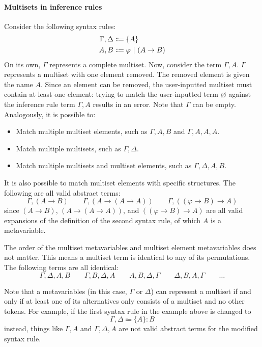 \paragraph{Multisets in inference rules}
\label{inference:multisets}
Consider the following syntax rules:
\begin{align*}
    \Gamma, \Delta &\Coloneqq \{ A \} \\
    A, B &\Coloneqq \varphi \ |\  (A \to B)
\end{align*}
On its own, $\Gamma$ represents a complete multiset. Now, consider the term $\Gamma, A$. $\Gamma$ represents a multiset with one element removed. The removed element is given the name $A$. Since an element can be removed, the user-inputted multiset must contain at least one element: trying to match the user-inputted term $\varnothing$ against the inference rule term $\Gamma, A$ results in an error. Note that $\Gamma$ can be empty. Analogously, it is possible to:
\begin{itemize}
    \item Match multiple multiset elements, such as $\Gamma, A, B$ and $\Gamma, A, A, A$.
    \item Match multiple multisets, such as $\Gamma, \Delta$.
    \item Match multiple multisets and multiset elements, such as $\Gamma, \Delta, A, B$.
\end{itemize}

It is also possible to match multiset elements with specific structures. The following are all valid abstract terms:
\[
    \Gamma, (A \to B) \qquad \Gamma, (A \to (A \to A)) \qquad \Gamma, ((\varphi \to B) \to A)
\]
since $(A \to B)$, $(A \to (A \to A))$, and $((\varphi \to B) \to A)$ are all valid expansions of the definition of the second syntax rule, of which $A$ is a metavariable.

The order of the multiset metavariables and multiset element metavariables does not matter. This means a multiset term is identical to any of its permutations. The following terms are all identical:
\[
    \Gamma, \Delta, A, B \qquad \Gamma, B, \Delta, A \qquad A, B, \Delta, \Gamma \qquad \Delta, B, A, \Gamma \qquad \ldots
\]

Note that a metavariables (in this case, $\Gamma$ or $\Delta$) can represent a multiset if and only if at least one of its alternatives only consists of a multiset and no other tokens. For example, if the first syntax rule in the example above is changed to
\[
    \Gamma, \Delta \Coloneqq \{ A \}: B
\]
instead, things like $\Gamma, A$ and $\Gamma, \Delta, A$ are not valid abstract terms for the modified syntax rule.

